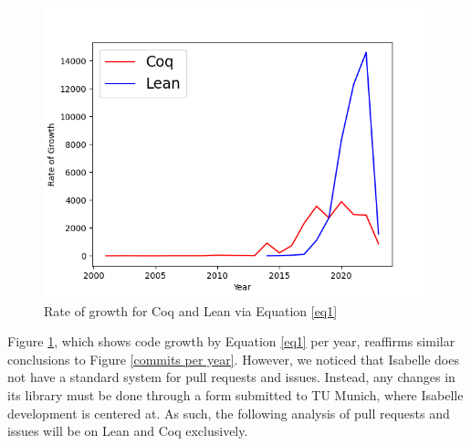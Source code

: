 \documentclass[sigconf,nonacm]{acmart}
\begin{document}
\begin{figure}[H]
  \includegraphics[scale=0.5]{rate.png}
  \caption{Rate of growth for Coq and Lean via Equation \ref{eq1}}
  \label{rate of growth}
\end{figure}

Figure \ref{rate of growth}, which shows code growth by Equation \ref{eq1} per year, reaffirms similar conclusions to Figure \ref{commits per year}. However, we noticed that Isabelle does not have a standard system for pull requests and issues. Instead, any changes in its library must be done through a form submitted to TU Munich, where Isabelle development is centered at. As such, the following analysis of pull requests and issues will be on Lean and Coq exclusively. 
\end{document}
